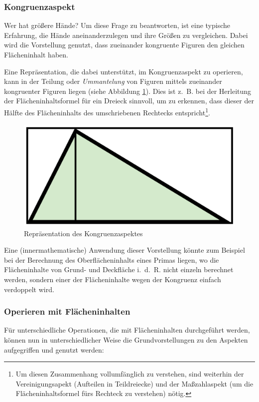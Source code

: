 \documentclass[
]{scrbook}
\theoremstyle{definition}
\theoremstyle{definition}
\theoremstyle{definition}
\theoremstyle{definition}
\theoremstyle{remark}
\begin{document}
\hypertarget{kongruenzaspekt}{%
\subsubsection{Kongruenzaspekt}\label{kongruenzaspekt}}

Wer hat größere Hände? Um diese Frage zu beantworten, ist eine typische Erfahrung, die Hände aneinanderzulegen und ihre Größen zu vergleichen. Dabei wird die Vorstellung genutzt, dass zueinander kongruente Figuren den gleichen Flächeninhalt haben.

Eine Repräsentation, die dabei unterstützt, im Kongruenzaspekt zu operieren, kann in der Teilung oder \emph{Ummantelung} von Figuren mittels zueinander kongruenter Figuren liegen (siehe Abbildung \ref{fig:FlaecheKongruenz}). Dies ist z.~B. bei der Herleitung der Flächeninhaltsformel für ein Dreieck sinnvoll, um zu erkennen, dass dieser der Hälfte des Flächeninhalts des umschriebenen Rechtecks entspricht\footnote{Um diesen Zusammenhang vollumfänglich zu verstehen, sind weiterhin der Vereinigungsapekt (Aufteilen in Teildreiecke) und der Maßzahlaspekt (um die Flächeninhaltsformel fürs Rechteck zu verstehen) nötig.}.

\begin{figure}

{\centering \includegraphics[width=0.25\linewidth]{pictures/5-Kongruenz} 

}

\caption{Repräsentation des Kongruenzaspektes}\label{fig:FlaecheKongruenz}
\end{figure}

Eine (innermathematische) Anwendung dieser Vorstellung könnte zum Beispiel bei der Berechnung des Oberflächeninhalts eines Primas liegen, wo die Flächeninhalte von Grund- und Deckfläche i.~d.~R. nicht einzeln berechnet werden, sondern einer der Flächeninhalte wegen der Kongruenz einfach verdoppelt wird.

\hypertarget{operieren-mit-fluxe4cheninhalten}{%
\subsubsection{Operieren mit Flächeninhalten}\label{operieren-mit-fluxe4cheninhalten}}

Für unterschiedliche Operationen, die mit Flächeninhalten durchgeführt werden, können nun in unterschiedlicher Weise die Grundvorstellungen zu den Aspekten aufgegriffen und genutzt werden:
\end{document}
